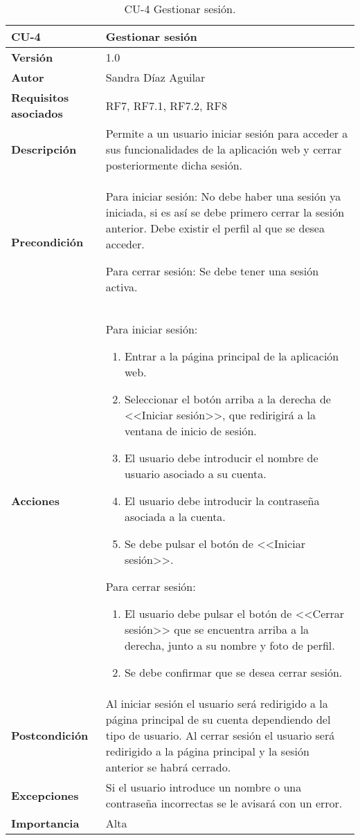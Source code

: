 \begin{table}[p]
	\centering
	\begin{tabularx}{\linewidth}{ p{} p{} }
		\toprule
		\textbf{CU-4}    & \textbf{Gestionar sesión}\\
		\toprule
		\textbf{Versión}              & 1.0    \\
		\textbf{Autor}                & Sandra Díaz Aguilar \\
		\textbf{Requisitos asociados} & RF7, RF7.1, RF7.2, RF8 \\
		\textbf{Descripción}          & Permite a un usuario iniciar sesión para acceder a sus funcionalidades de la aplicación web y cerrar posteriormente dicha sesión.  \\
		\textbf{Precondición}         & Para iniciar sesión: No debe haber una sesión ya iniciada, si es así se debe primero cerrar la sesión anterior. Debe existir el perfil al que se desea acceder. 
  
        Para cerrar sesión: Se debe tener una sesión activa.  \\
		\textbf{Acciones}             & Para iniciar sesión:
		\begin{enumerate}
			\def\labelenumi{\arabic{enumi}.}
			\tightlist
			\item Entrar a la página principal de la aplicación web.
			\item Seleccionar el botón arriba a la derecha de <<Iniciar sesión>>, que redirigirá a la ventana de inicio de sesión. 
            \item El usuario debe introducir el nombre de usuario asociado a su cuenta. 
            \item El usuario debe introducir la contraseña asociada a la cuenta. 
            \item Se debe pulsar el botón de <<Iniciar sesión>>. 
		\end{enumerate}
                                        Para cerrar sesión:
        \begin{enumerate}
			\def\labelenumi{\arabic{enumi}.}
			\tightlist
			\item El usuario debe pulsar el botón de <<Cerrar sesión>> que se encuentra arriba a la derecha, junto a su nombre y foto de perfil. 
			\item Se debe confirmar que se desea cerrar sesión.
		\end{enumerate} \\
		\textbf{Postcondición}        & Al iniciar sesión el usuario será redirigido a la página principal de su cuenta dependiendo del tipo de usuario. Al cerrar sesión el usuario será redirigido a la página principal y la sesión anterior se habrá cerrado.  \\
		\textbf{Excepciones}          & Si el usuario introduce un nombre o una contraseña incorrectas se le avisará con un error.  \\
		\textbf{Importancia}          & Alta \\
		\bottomrule
	\end{tabularx}
	\caption{CU-4 Gestionar sesión.}
\end{table}


